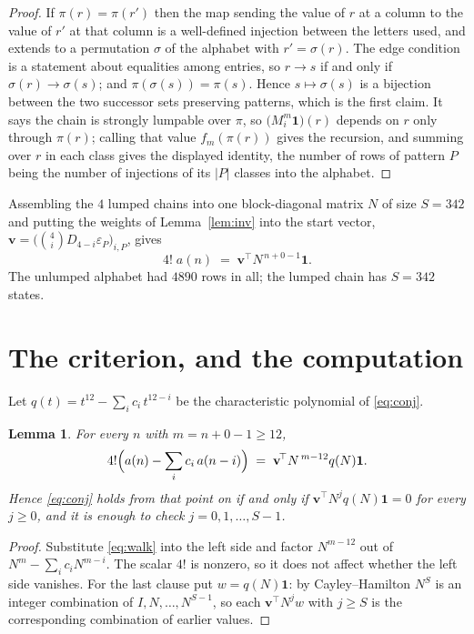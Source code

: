 \documentclass[11pt,a4paper]{article}
\theoremstyle{plain}
\newtheorem{lemma}[theorem]{Lemma}
\theoremstyle{definition}
\begin{document}
\begin{proof}
If $\pi(r)=\pi(r')$ then the map sending the value of $r$ at a column to the value of $r'$
at that column is a well-defined injection between the letters used, and extends to a
permutation $\sigma$ of the alphabet with $r'=\sigma(r)$. The edge condition is a statement
about equalities among entries, so $r\to s$ if and only if $\sigma(r)\to\sigma(s)$; and
$\pi(\sigma(s))=\pi(s)$. Hence $s\mapsto\sigma(s)$ is a bijection between the two successor
sets preserving patterns, which is the first claim. It says the chain is strongly lumpable
over $\pi$, so $\bigl(M_i^{m}\mathbf{1}\bigr)(r)$ depends on $r$ only through $\pi(r)$;
calling that value $f_m(\pi(r))$ gives the recursion, and summing over $r$ in each class
gives the displayed identity, the number of rows of pattern $P$ being the number of
injections of its $|P|$ classes into the alphabet.
\end{proof}

Assembling the $4$ lumped chains into one block-diagonal matrix $N$ of size $S=342$ and
putting the weights of Lemma~\ref{lem:inv} into the start vector,
$\mathbf{v}=\bigl(\binom{4}{i}D_{4-i}\varepsilon_P\bigr)_{i,P}$, gives
\begin{equation}\label{eq:walk}
4!\;a(n)\;=\;\mathbf{v}^{\!\top}N^{\,n+0-1}\mathbf{1} .
\end{equation}
The unlumped alphabet had $4890$ rows in all; the lumped chain has $S=342$ states.

\section{The criterion, and the computation}

Let $q(t)=t^{12}-\sum_i c_i\,t^{12-i}$ be the characteristic polynomial of
\eqref{eq:conj}.

\begin{lemma}\label{lem:crit}
For every $n$ with $m=n+0-1\ge12$,
\[
4!\Bigl(a(n)-\sum_i c_i\,a(n-i)\Bigr)\;=\;\mathbf{v}^{\!\top}N^{\,m-12}q(N)\mathbf{1} .
\]
Hence \eqref{eq:conj} holds from that point on if and only if
$\mathbf{v}^{\!\top}N^{j}q(N)\mathbf{1}=0$ for every $j\ge0$, and it is enough to check
$j=0,1,\dots,S-1$.
\end{lemma}

\begin{proof}
Substitute \eqref{eq:walk} into the left side and factor $N^{m-12}$ out of
$N^{m}-\sum_i c_iN^{m-i}$. The scalar $4!$ is nonzero, so it does not affect whether
the left side vanishes. For the last clause put $w=q(N)\mathbf{1}$: by Cayley--Hamilton
$N^{S}$ is an integer combination of $I,N,\dots,N^{S-1}$, so each
$\mathbf{v}^{\!\top}N^{j}w$ with $j\ge S$ is the corresponding combination of earlier
values.
\end{proof}
\end{document}

